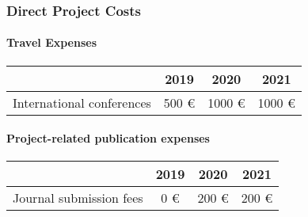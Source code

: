 \documentclass[a4paper,12pt]{article}
\begin{document}
\subsubsection{Direct Project Costs}


\paragraph{Travel Expenses}

\begin{center}
\begin{tabular}{l c c c}
 & 2019 & 2020 & 2021 \\
\hline 
International conferences & 500 \euro{} & 1000 \euro{} & 1000 \euro{} \\
\end{tabular}
\end{center}




\paragraph{Project-related publication expenses}

\begin{center}
\begin{tabular}{l c c c}
 & 2019 & 2020 & 2021 \\
\hline 
Journal submission fees & 0 \euro{} & 200 \euro{} & 200 \euro{} \\
\end{tabular}
\end{center}
\end{document}
